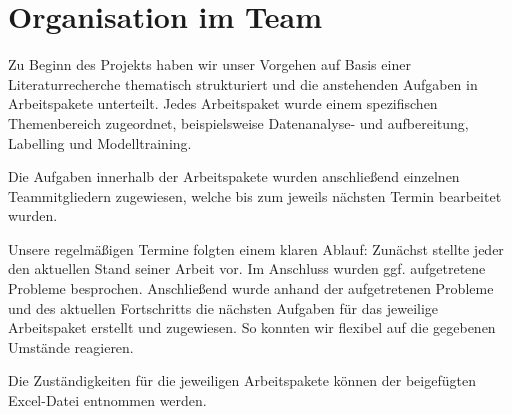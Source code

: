 \chapter{Organisation im Team}

Zu Beginn des Projekts haben wir unser Vorgehen auf Basis einer Literaturrecherche thematisch 
strukturiert und die anstehenden Aufgaben in Arbeitspakete unterteilt. Jedes Arbeitspaket wurde 
einem spezifischen Themenbereich zugeordnet, beispielsweise Datenanalyse- und aufbereitung, 
Labelling und Modelltraining.

Die Aufgaben innerhalb der Arbeitspakete wurden anschließend einzelnen Teammitgliedern 
zugewiesen, welche bis zum jeweils nächsten Termin bearbeitet wurden.

Unsere regelmäßigen Termine folgten einem klaren Ablauf: Zunächst stellte 
jeder den aktuellen Stand seiner Arbeit vor. Im Anschluss wurden ggf. aufgetretene Probleme 
besprochen. Anschließend wurde anhand der aufgetretenen Probleme und des aktuellen Fortschritts 
die nächsten Aufgaben für das jeweilige Arbeitspaket erstellt und zugewiesen. So konnten wir 
flexibel auf die gegebenen Umstände reagieren. 

Die Zuständigkeiten für die jeweiligen Arbeitspakete können der beigefügten Excel-Datei entnommen 
werden. 